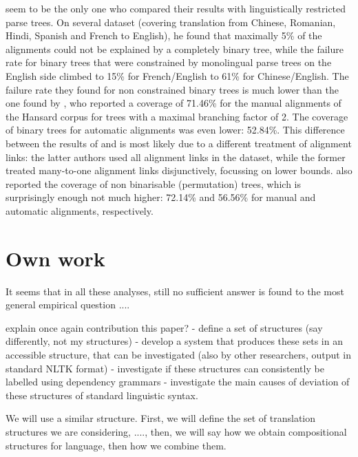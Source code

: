 \documentclass{report}
\theoremstyle{definition}
\theoremstyle{plain}
\begin{document}
\cite{wellington2006empirical} seem to be the only one who compared their results with linguistically restricted parse trees. On several dataset (covering translation from Chinese, Romanian, Hindi, Spanish and French to English), he found that maximally 5\% of the alignments could not be explained by a completely binary tree, while the failure rate for binary trees that were constrained by monolingual parse trees on the English side climbed to 15\% for French/English to 61\% for Chinese/English. The failure rate they found for non constrained binary trees is much lower than the one found by \cite{simaan2013hats}, who reported a coverage of 71.46\% for the manual alignments of the Hansard corpus for trees with a maximal branching factor of 2. The coverage of binary trees for automatic alignments was even lower: 52.84\%. This difference between the results of \cite{wellington2006empirical} and \cite{simaan2013hats} is most likely due to a different treatment of alignment links: the latter authors used all alignment links in the dataset, while the former treated many-to-one alignment links disjunctively, focussing on lower bounds. \cite{simaan2013hats} also reported the coverage of non binarisable (permutation) trees, which is surprisingly enough not much higher: 72.14\% and 56.56\% for manual and automatic alignments, respectively.







\chapter{Own work}

It seems that in all these analyses, still no sufficient answer is found to the most general empirical question ....

explain once again contribution this paper?
- define a set of structures (say differently, not my structures)
- develop a system that produces these sets in an accessible structure, that can be investigated (also by other researchers, output in standard NLTK format)
- investigate if these structures can consistently be labelled using dependency grammars
- investigate the main causes of deviation of these structures of standard linguistic syntax.

We will use a similar structure. First, we will define the set of translation structures we are considering, ...., then, we will say how we obtain compositional structures for language, then how we combine them.
\end{document}
